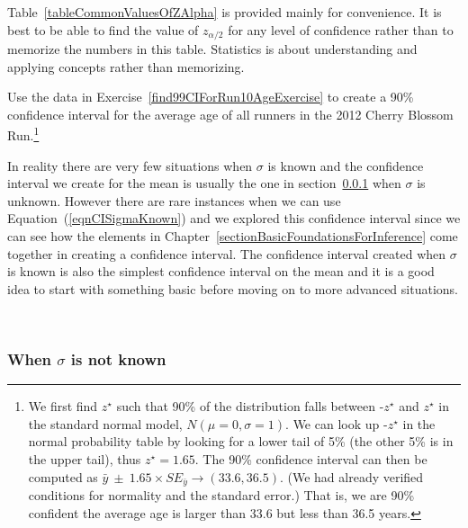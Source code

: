 Table~\ref{tableCommonValuesOfZAlpha} is provided mainly for convenience.
It is best to be able to find the value of $z_{\alpha/2}$ for any level of confidence
rather than to memorize the numbers in this table.
Statistics is about understanding and applying concepts rather than memorizing.


\begin{exercise} \label{find90CIForRun10AgeExercise}
Use the data in Exercise~\ref{find99CIForRun10AgeExercise} to create a 90\% confidence interval for the average age of all runners in the 2012 Cherry Blossom Run.\footnote{We first find $z^{\star}$ such that 90\% of the distribution falls between -$z^{\star}$ and $z^{\star}$ in the standard normal model, $N(\mu=0, \sigma=1)$. We can look up -$z^{\star}$ in the normal probability table by looking for a lower tail of 5\% (the other 5\% is in the upper tail), thus $z^{\star}=1.65$. The 90\% confidence interval can then be computed as $\bar{y}\ \pm\ 1.65\times SE_{\bar{y}} \to (33.6, 36.5)$. (We had already verified conditions for normality and the standard error.) That is, we are 90\% confident the average age is larger than 33.6 but less than 36.5 years.}
\end{exercise}



In reality there are very few situations when $\sigma$ is known and the confidence interval we create for the mean is usually
the one in section~\ref{sectionsectionCIWhenSigmaIsNOTKnown} when $\sigma$ is unknown.
However there are rare instances when we can use Equation~(\ref{eqnCISigmaKnown})
and we explored this confidence interval since we can see how the elements in Chapter~\ref{sectionBasicFoundationsForInference} come together in creating a confidence interval.
The confidence interval created when $\sigma$ is known is also the 
simplest confidence interval on the mean and it is a good idea to start with something basic before moving
on to more advanced situations.


\hfill\\
{\color{red}{FILL UP WITH SOMETHING}}

\vfill


\pagebreak

\subsubsection{When $\sigma$ is not known}
\label{sectionsectionCIWhenSigmaIsNOTKnown}
\label{oneSampleTConfidenceIntervals}

